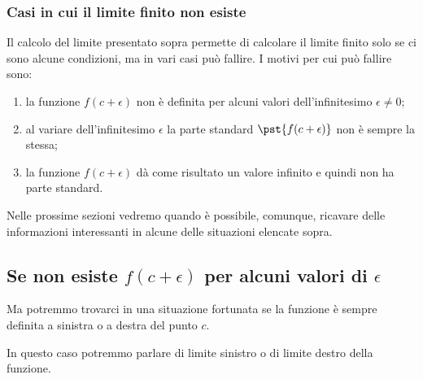 \subsubsection{Casi in cui il limite finito non esiste}
\label{subsubsec:cont_limiti_nonesiste}

Il calcolo del limite presentato sopra permette di calcolare il limite 
finito solo se ci sono alcune condizioni, ma in vari casi può fallire. 
I motivi per cui può fallire sono:
\begin{enumerate} [nosep]
\item la funzione \(f(c+\epsilon)\) non è definita per alcuni valori 
dell'infinitesimo \(\epsilon \neq 0\); 
\item al variare dell'infinitesimo \(\epsilon\) la parte standard 
\(\pst{f(c+\epsilon)}\) non è sempre la stessa;
\item la funzione \(f(c+\epsilon)\) dà come risultato un valore infinito e 
quindi non ha parte standard. 
\end{enumerate}

Nelle prossime sezioni vedremo quando è possibile, comunque, ricavare delle 
informazioni interessanti in alcune delle situazioni elencate sopra.

\subsection{Se non esiste \(f(c+\epsilon)\) per alcuni valori di 
\(\epsilon\)}
\label{subsec:cont_limiti_nonsempreesiste}


Ma potremmo trovarci in una situazione fortunata se la funzione è sempre 
definita a sinistra o a destra del punto \(c\).

In questo caso potremmo parlare di limite sinistro o di limite destro della 
funzione.


